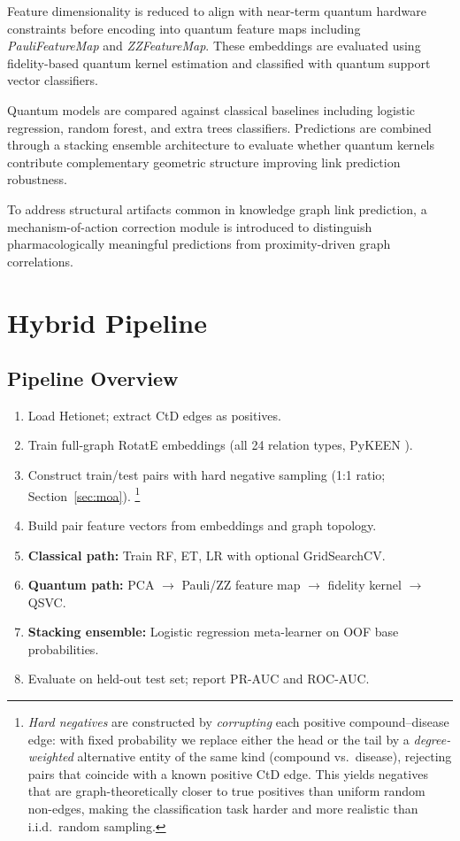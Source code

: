 Feature dimensionality is reduced to align with near-term quantum hardware
constraints before encoding into quantum feature maps including
\textit{PauliFeatureMap} and \textit{ZZFeatureMap}. These embeddings are
evaluated using fidelity-based quantum kernel estimation and classified with
quantum support vector classifiers.

Quantum models are compared against classical baselines including logistic
regression, random forest, and extra trees classifiers. Predictions are
combined through a stacking ensemble architecture to evaluate whether quantum
kernels contribute complementary geometric structure improving link prediction
robustness.

To address structural artifacts common in knowledge graph link prediction, a
mechanism-of-action correction module is introduced to distinguish
pharmacologically meaningful predictions from proximity-driven graph
correlations.
\fi

\section{Hybrid Pipeline}

\subsection{Pipeline Overview}

\begin{enumerate}[leftmargin=*,label=\arabic*.]
\item Load Hetionet; extract CtD edges as positives.
\item Train full-graph RotatE embeddings (all 24 relation types, PyKEEN \cite{pykeen2021}).
\item Construct train/test pairs with hard negative sampling
  (1:1 ratio; Section~\ref{sec:moa}).%
  \footnote{%
  \emph{Hard negatives} are constructed by \emph{corrupting} each positive
  compound--disease edge: with fixed probability we replace either the head or
  the tail by a \emph{degree-weighted} alternative entity of the same kind
  (compound vs.\ disease), rejecting pairs that coincide with a known positive
  CtD edge.
  This yields negatives that are graph-theoretically closer to true positives
  than uniform random non-edges, making the classification task harder and more
  realistic than i.i.d.\ random sampling.%
  }
\item Build pair feature vectors from embeddings and graph topology.
\item \textbf{Classical path:} Train RF, ET, LR with optional GridSearchCV.
\item \textbf{Quantum path:} PCA $\to$ Pauli/ZZ feature map $\to$ fidelity kernel $\to$ QSVC.
\item \textbf{Stacking ensemble:} Logistic regression meta-learner on OOF base probabilities.
\item Evaluate on held-out test set; report PR-AUC and ROC-AUC.
\end{enumerate}

